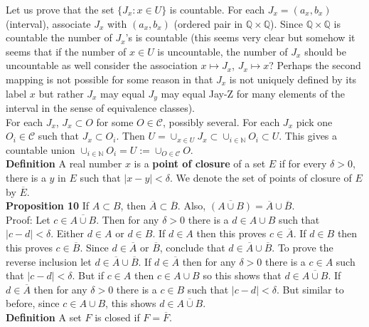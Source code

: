 \documentclass[a4paper]{article}
\begin{document}
Let us prove that the set $\{J_x : x \in U\}$ is countable. For each $J_x = (a_x,b_x)$ (interval), associate $J_x$ with $(a_x,b_x)$ (ordered pair in $\mathbb{Q}\times \mathbb{Q}$). Since $\mathbb{Q} \times \mathbb{Q}$ is countable the number of $J_x$'s is countable (this seems very clear but somehow it seems that if the number of $x \in U$ is uncountable, the number of $J_x$ should be uncountable as well consider the association $x \mapsto J_x$, $J_x \mapsto x$? Perhaps the second mapping is not possible for some reason in that $J_x$ is not uniquely defined by its label $x$ but rather $J_x$ may equal $J_y$ may equal Jay-Z for many elements of the interval in the sense of equivalence classes).\\

For each $J_x$, $J_x \subset O$ for some $O \in \mathcal{C}$, possibly several. For each $J_x$ pick one $O_i \in \mathcal{C}$ such that $J_x \subset O_i$. Then $U = \cup_{x \in U} J_x \subset \cup_{i \in \mathbb{N}}O_i \subset U$. This gives a countable union $\cup_{i \in \mathbb{N}}O_i = U := \cup_{O \in \mathcal{C}}O$. \\

{\bf Definition} A real number $x$ is a {\bf point of closure} of a set $E$ if for every $\delta > 0$, there is a $y$ in $E$ such that $|x-y|<\delta$. We denote the set of points of closure of $E$ by $\overline{E}$.\\


{\bf Proposition 10} If $A\subset B$, then $\overline{A}\subset \overline{B}$. Also, $\overline{(A\cup B)} = \overline{A}\cup \overline{B}$. \\

Proof: Let $c \in \overline{A\cup B}$. Then for any $\delta > 0$ there is a $d \in A\cup B$ such that $|c-d| <\delta$. Either $d \in A$ or $d\in B$. If $d \in A$ then this proves $c \in \overline{A}$. If $d \in B$ then this proves $c \in \overline{B}$. Since $d \in \overline{A}$ or $\overline{B}$, conclude that $d \in \overline{A} \cup \overline{B}$. To prove the reverse inclusion let $d \in \overline{A}\cup \overline{B}$. If $d \in \overline{A}$ then for any $\delta > 0$ there is a $c \in A$ such that $|c-d| < \delta$. But if $c \in A$ then $c \in A\cup B$ so this shows that $d \in \overline{A\cup B}$. If $d \in \overline{A}$ then for any $\delta > 0$ there is a $c \in B$ such that $|c-d|<\delta$. But similar to before, since $c \in A\cup B$, this shows $d \in \overline{A\cup B}$. \\

{\bf Definition} A set $F$ is closed if $F = \overline{F}$. \\
\end{document}

